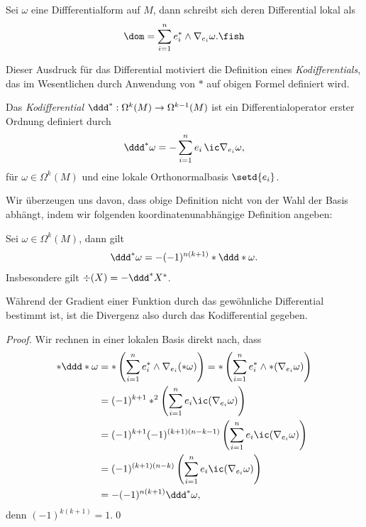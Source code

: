 \documentclass[%
	paper=a5,%
	fleqn,%
	DIV=18,%
	BCOR=0mm,
	fontsize=11pt,
	titlepage=false,%
	bibliography=totoc,
	DIV=18,%
	twoside=true,
	pdftitle=Riemannsche Geometrie,
	pdfauthor=Uwe Semmelmann,
	numbers=noendperiod]%
	{scrbook}
\begin{document}
\begin{lem}
Sei $\omega$ eine Diffferentialform auf $M$, dann schreibt sich deren Differential lokal als
\begin{align*}
\dom = \sum_{i=1}^n e_{i}^* \wedge \nabla_{e_{i}}\omega.\fish
\end{align*}
\end{lem}

Dieser Ausdruck für das Differential motiviert die Definition eines \textit{Kodifferentials}, das im Wesentlichen durch Anwendung von $*$ auf obigen Formel definiert wird.

\begin{defn}
Das \emph{Kodifferential} $\ddd^*: \Omega^k(M)\to \Omega^{k-1}(M)$ ist ein Differentialoperator erster Ordnung definiert durch
\begin{align*}
\ddd^*\omega = - \sum_{i=1}^n e_{i}\,\ic \nabla_{e_{i}}\omega,
\end{align*}
für $\omega\in\Omega^k(M)$ und eine lokale Orthonormalbasis $\setd{e_{i}}$.\fish
\end{defn}

Wir überzeugen uns davon, dass obige Definition nicht von der Wahl der Basis abhängt, indem wir folgenden koordinatenunabhängige Definition angeben:

\begin{lem}
\label{lem:Kodifferential-Hodge}
Sei $\omega\in\Omega^k(M)$, dann gilt
\begin{align*}
\ddd^*\omega = -(-1)^{n(k+1)}*\ddd*\omega.
\end{align*}
Insbesondere gilt $\div(X) = -\ddd^*X^*$.\fish
\end{lem}

Während der Gradient einer Funktion durch das gewöhnliche Differential bestimmt ist, ist die Divergenz also durch das Kodifferential gegeben.

\begin{proof}
Wir rechnen in einer lokalen Basis direkt nach, dass
\begin{align*}
*\ddd*\omega &= *\left(
\sum_{i=1}^n e_{i}^* \wedge \nabla_{e_{i}}(*\omega)\right)
= *\left(\sum_{i=1}^n e_{i}^*\wedge *(\nabla_{e_{i}}\omega)\right)\\
&= (-1)^{k+1}*^2
\left(\sum_{i=1}^n e_{i}\ic (\nabla_{e_{i}}\omega)\right)\\
&= (-1)^{k+1}(-1)^{(k+1)(n-k-1)}
\left(\sum_{i=1}^n e_{i}\ic (\nabla_{e_{i}}\omega)\right)\\
&= (-1)^{(k+1)(n-k)}
\left(\sum_{i=1}^n e_{i}\ic (\nabla_{e_{i}}\omega)\right)\\
&=
-(-1)^{n(k+1)}\ddd^* \omega,
\end{align*}
denn $(-1)^{k(k+1)} = 1$.\qed
\end{proof}
\end{document}
